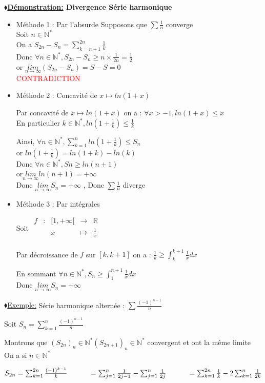 \documentclass[12pt]{report}
\newcommand{\rd}[1]{\textcolor{red}{#1}}
\newcommand{\blz}{$\blacklozenge$}
\newcommand{\ns}{\\\indent\indent\vspace{0.25cm}}
\newcommand{\demos}[1]
{
\begin{demo}
\textbf{\underline{\blz Démonstration:} #1}
\newline
}
\newcommand{\demoe}
{
\end{demo}
}
\newcommand{\exe}[1]
{
\underline{\blz Exemple:} #1
}
\newcommand{\R}{\mathbb{R}}
\newcommand{\N}{\mathbb{N}}
\newcommand{\zint}[1]{#1 \in \N^*}
\newcommand{\limi}[1]{\underset{#1 \to \infty}{lim}}
\newcommand{\harmonique}{\sum \frac{1}{n}}
\newcommand{\serie}[3]{\sum_{#1}^{#2}{#3}}
\newcommand{\fct}[5]
	{
	  \begin{array}{ccccc}
		#1 & : & #2 & \to & #3 \\
	    && #4 & \mapsto & #5 \\
	  \end{array}
	}
\newcommand{\dfct}[2] {#1 \mapsto #2}
\begin{document}
\demos{Divergence Série harmonique}
\begin{itemize}
  \item Méthode 1 : Par l'absurde
Supposons que $\harmonique$ converge\\
Soit $\zint{n}$\\
On a $S_{2n}-S_n = \serie{k=n+1}{2n}{\frac{1}{k}}$ \\
Donc $\forall \zint{n} , S_{2n}-S_n \geq n \times \frac{1}{2n} = \frac{1}{2}$ \\
or $\limi{n}(S_{2n}-S_n) = S-S = 0$\\
\rd{CONTRADICTION}

  \item Méthode 2 : Concavité de $\dfct{x}{ln(1+x)}$

Par concavité de $\dfct{x}{ln(1+x)}$ on a : $\forall x > -1, ln(1+x) \leq x$\\
En particulier $\zint{k} , ln(1+ \frac{1}{k}) \leq \frac{1}{k} $\ns

Ainsi, $\forall \zint{n}, \serie{k=1}{n}{ln(1+\frac{1}{k})} \leq S_n$\\
or $ln(1+\frac{1}{k}) = ln(1+k) - ln(k)$\\
Donc $\forall \zint{n}, Sn \geq ln(n+1)$\\
or$ \limi{n}ln(n+1) = +\infty$\\
Donc $\limi{n}S_n = +\infty$ , Donc $\harmonique$ diverge\\

  \item Méthode 3 : Par intégrales

Soit $\fct{f}{[1,+\infty[}{\R}{x}{\frac{1}{x}}$

Par décroissance de $f$ sur $[k,k+1]$ on a : $\frac{1}{k} \geq \int_k^{k+1}\frac{1}{x}dx$

En sommant $\forall \zint{n},S_n \geq \int_1^{n+1}\frac{1}{x}dx$\\
Donc $\limi{n}S_n = +\infty$
\end{itemize}
\demoe

\exe{Série harmonique alternée} : $\sum \frac{(-1)^{n-1}}{n}$

Soit $S_n  = \serie{k=1}{n}{\frac{(-1)^{n-1}}{n}}$

Montrons que $(S_{2n})_\zint{n} (S_{2n+1})_\zint{n}$ convergent et ont la même limite\\
On a si $\zint{n}$ \ns

$S_{2n} = \serie{k=1}{2n}{\frac{(-1)^{k-1}}{k}} \ns = \serie{j=1}{n}{\frac{1}{2j-1}}-\serie{j=1}{n}{\frac{1}{2j}} \ns = \serie{k=1}{2n}{\frac{1}{k}} - 2 \serie{k=1}{n}{\frac{1}{2k}}$
\end{document}
